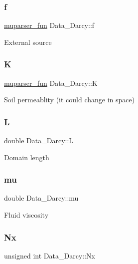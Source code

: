 \subsubsection{\texorpdfstring{f}{f}}
{\footnotesize\ttfamily \hyperlink{classmuparser__fun}{muparser\+\_\+fun} Data\+\_\+\+Darcy\+::f}

External source \mbox{\label{classData__Darcy_acde360b15a8f19205ef8bdc6221c7ef1}} 
\subsubsection{\texorpdfstring{K}{K}}
{\footnotesize\ttfamily \hyperlink{classmuparser__fun}{muparser\+\_\+fun} Data\+\_\+\+Darcy\+::K}

Soil permeablity (it could change in space) \mbox{\label{classData__Darcy_a9a09be5df0d4a24091f0600aa7583edd}} 
\subsubsection{\texorpdfstring{L}{L}}
{\footnotesize\ttfamily double Data\+\_\+\+Darcy\+::L}

Domain length \mbox{\label{classData__Darcy_a1873e9645090a2a2cc2b4136e2cbd9c7}} 
\subsubsection{\texorpdfstring{mu}{mu}}
{\footnotesize\ttfamily double Data\+\_\+\+Darcy\+::mu}

Fluid viscosity \mbox{\label{classData__Darcy_a5bdb5c38b6f66e242b6b9ab723def8f0}} 
\subsubsection{\texorpdfstring{Nx}{Nx}}
{\footnotesize\ttfamily unsigned int Data\+\_\+\+Darcy\+::\+Nx}


